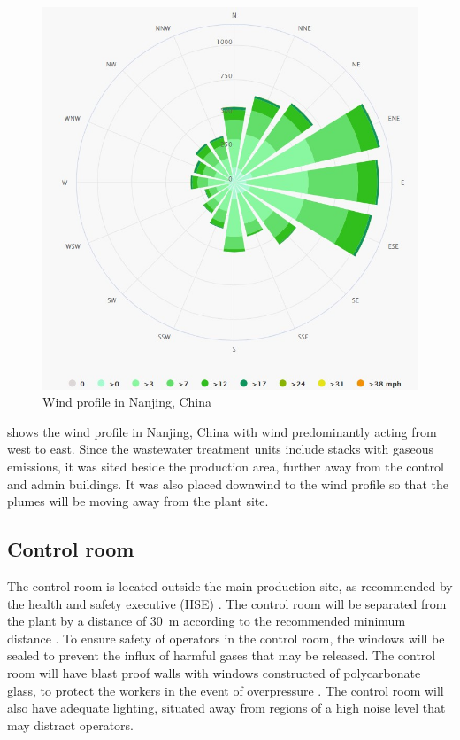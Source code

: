 \begin{figure}
\vspace{-\intextsep}
\includegraphics[width=\linewidth]{chapters/5-safety-layout-environment/figures/Windrose_profile.jpg}
\caption{Wind profile in Nanjing, China \cite{meteoblue_climate_nodate}}
\label{fig:wind}
\end{figure}
 shows the wind profile in Nanjing, China with wind predominantly acting from west to east. Since the wastewater treatment units include stacks with gaseous emissions, it was sited beside the production area, further away from the control and admin buildings. It was also placed downwind to the wind profile so that the plumes will be moving away from the plant site.  

\subsection{Control room}

The control room is located outside the main production site, as recommended by the health and safety executive (HSE) \cite{health_and_safety_executive_control_nodate}. The control room will be separated from the plant by a distance of \SI{30}{\m} according to the recommended minimum distance \cite{mannan_lees_2012}. To ensure safety of operators in the control room, the windows will be sealed to prevent the influx of harmful gases that may be released. The control room will have blast proof walls with windows constructed of polycarbonate glass, to protect the workers in the event of overpressure \cite{health_and_safety_executive_control_nodate}. The control room will also have adequate lighting, situated away from regions of a high noise level that may distract operators.


